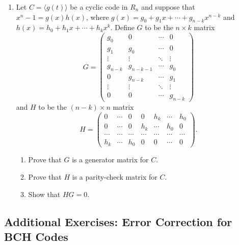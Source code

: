 {\begin{enumerate}
\item
Let $C = \langle g(t) \rangle$ be a cyclic code in $R_n$ and suppose
that $x^n - 1 = g(x) h(x)$, where $g(x) = g_0 + g_1 x + \cdots +
g_{n-k} x^{n-k}$ and $h(x) = h_0 + h_1 x +  \cdots + h_k x^k$. Define
$G$ to be the $n \times k$ matrix
\[
G = 
\begin{pmatrix}
g_0 & 0   & \cdots & 0 \\
g_1 & g_0 & \cdots & 0 \\
\vdots & \vdots &\ddots & \vdots \\
g_{n-k}   & g_{n-k-1} & \cdots & g_0 \\
0   & g_{n-k} & \cdots & g_{1} \\
\vdots & \vdots & \ddots & \vdots \\
0   & 0 & \cdots & g_{n-k}
\end{pmatrix}
\]
and $H$ to be the $(n-k) \times n$ matrix 
\[
H =
\begin{pmatrix}
0   & \cdots & 0   & 0      & h_k    & \cdots & h_0 \\
0   & \cdots & 0   & h_k    & \cdots & h_0    & 0 \\
\cdots & \cdots & \cdots  & \cdots & \cdots & \cdots & \cdots  \\
h_k & \cdots & h_0 & 0      & 0      & \cdots & 0 
\end{pmatrix}.
\]
\begin{enumerate}

\item
Prove that $G$ is a generator matrix for $C$.

\item
Prove that $H$ is a parity-check matrix for $C$.


\item
Show that $HG = 0$.


\end{enumerate}







\end{enumerate}
}
 

 
\subsection*{Additional Exercises: Error Correction for BCH Codes}


